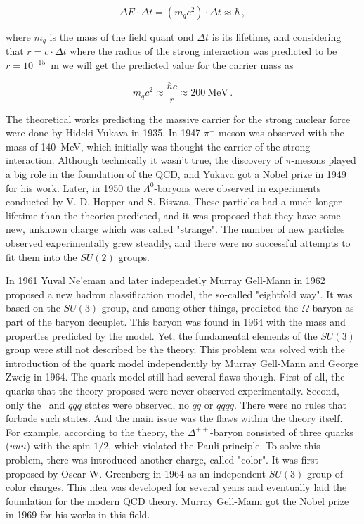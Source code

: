 \begin{equation}
\Delta E \cdot \Delta t = (m_{q}c^{2}) \cdot \Delta t \approx \hbar \,,
\end{equation}

where $m_{q}$ is the mass of the field quant ond $\Delta t$ is its lifetime, and considering that $r = c \cdot \Delta t$ where the radius of the strong interaction was predicted to be $r = 10^{-15}$~m we will get the predicted value for the carrier mass as

\begin{equation}
m_{q}c^{2} \approx \frac{\hbar c}{r} \approx 200 \: \mbox{MeV}\,.
\end{equation}

The theoretical works predicting the massive carrier for the strong nuclear force were done by Hideki Yukava in 1935. In 1947 $\pi^{+}$-meson was observed with the mass of 140~MeV, which initially was thought the carrier of the strong interaction. Although technically it wasn't true, the discovery of $\pi$-mesons played a big role in the foundation of the QCD, and Yukava got a Nobel prize in 1949 for his work. Later, in 1950 the $\Lambda^{0}$-baryons were observed in experiments conducted by V. D. Hopper and S. Biswas. These particles had a much longer lifetime than the theories predicted, and it was proposed that they have some new, unknown charge which was called "strange". The number of new particles observed experimentally grew steadily, and there were no successful attempts to fit them into the $SU(2)$ groups.

In 1961 Yuval Ne'eman and later independetly Murray Gell-Mann in 1962 proposed a new hadron classification model, the so-called "eightfold way". It was based on the $SU(3)$ group, and among other things, predicted the $\Omega$-baryon as part of the baryon decuplet. This baryon was found in 1964 with the mass and properties predicted by the model. Yet, the fundamental elements of the $SU(3)$ group were still not described be the theory. This problem was solved with the introduction of the quark model independently by Murray Gell-Mann and George Zweig in 1964. The quark model still had several flaws though. First of all, the quarks that the theory proposed were never observed experimentally. Second, only the \qqbar\ and $qqq$ states were observed, no $qq$ or $qqqq$. There were no rules that forbade such states. And the main issue was the flaws within the theory itself. For example, according to the theory, the $\Delta^{++}$-baryon consisted of three quarks ($uuu$) with the spin $1/2$, which violated the Pauli principle. To solve this problem, there was introduced another charge, called "color". It was first proposed by Oscar W. Greenberg in 1964 as an independent $SU(3)$ group of color charges. This idea was developed for several years and eventually laid the foundation for the modern QCD theory. Murray Gell-Mann got the Nobel prize in 1969 for his works in this field.

